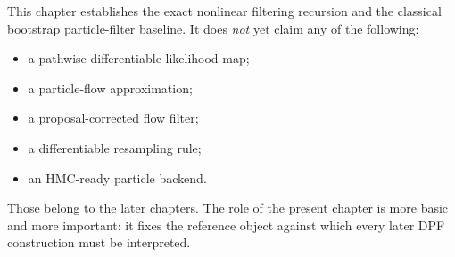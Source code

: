 This chapter establishes the exact nonlinear filtering recursion and the
classical bootstrap particle-filter baseline.  It does \emph{not} yet claim any
of the following:
\begin{itemize}
  \item a pathwise differentiable likelihood map;
  \item a particle-flow approximation;
  \item a proposal-corrected flow filter;
  \item a differentiable resampling rule;
  \item an HMC-ready particle backend.
\end{itemize}
Those belong to the later chapters.  The role of the present chapter is more
basic and more important: it fixes the reference object against which every
later DPF construction must be interpreted.
